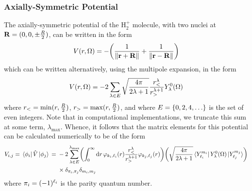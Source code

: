 \documentclass[draft]{article}
\begin{document}
\subsubsection*{Axially-Symmetric Potential}
The axially-symmetric potential of the $\mathrm{H}_{2}^{+}$ molecule, with two
nuclei at $\vb{R} = (0, 0, \pm \tfrac{R}{2})$, can be written in the form
\begin{equation}
  \label{eq:potential-axial}
  V\lr{r, \Omega}
  =
  -
  \lr[\bigg]
  {
    \dfrac
    {
      1
    }
    {
      \norm
      {
        \vb{r}
        +
        \vb{R}
      }
    }
    +
    \dfrac
    {
      1
    }
    {
      \norm
      {
        \vb{r}
        -
        \vb{R}
      }
    }
  }
\end{equation}
which can be written alternatively, using the multipole expansion, in the form
\begin{equation}
  \label{eq:potential-axial-multipole}
  V\lr{r, \Omega}
  =
  -
  2
  \sum_{\lambda \in E}
  \sqrt
  {
    \dfrac
    {
      4\pi
    }
    {
      2\lambda
      +
      1
    }
  }
  \dfrac
  {
    r_{<}^{\lambda}
  }
  {
    r_{>}^{\lambda + 1}
  }
  Y_{\lambda}^{0}\lr{\Omega}
\end{equation}
where $r_{<} = \min(r, \tfrac{R}{2})$, $r_{>} = \max(r, \tfrac{R}{2})$,
and where $E = \lrset{0, 2, 4, \dotsc}$ is the set of even integers.
Note that in computational implementations, we truncate this sum at some term,
$\lambda_{\max}$.
Whence, it follows that the matrix elements for this potential can be calculated
numerically to be of the form
\begin{alignat}{2}
  \label{eq:me-potential-axial}
  V_{i, j}
  =
  \bra*{\phi_{i}}
  \hat{V}
  \ket*{\phi_{j}}
  {}={}
  &
  -
  2
  \sum_{\lambda \in E}^{\lambda_{\max}}
  \lr[\bigg]
  {
    \int_{0}^{\infty}
    \dd{r}
    \varphi_{k_{i}, \ell_{i}}\lr{r}
    \dfrac
    {
      r_{<}^{\lambda}
    }
    {
      r_{>}^{\lambda + 1}
    }
    \varphi_{k_{j}, \ell_{j}}\lr{r}
  }
  \lr[\bigg]
  {
    \sqrt
    {
      \dfrac
      {
        4\pi
      }
      {
        2\lambda
        +
        1
      }
    }
    \bra*{Y_{\ell_{i}}^{m_{i}}}
    Y_{\lambda}^{0}\lr{\Omega}
    \ket*{Y_{\ell_{j}}^{m_{j}}}
  }
  \\
  &
  {}\times{}
  \delta_{\pi_{i}, \pi_{j}}
  \delta_{m_{i}, m_{j}}
  \nonumber
\end{alignat}
where $\pi_{i} = (-1)^{\ell_{i}}$ is the parity quantum number.
\end{document}

